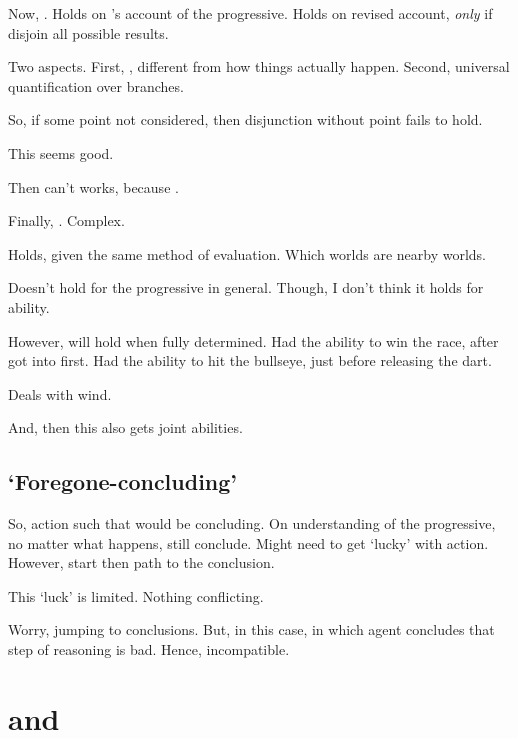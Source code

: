\begin{note}
  Now, \BoyVS{}.
  Holds on \citeauthor{Landman:1992wh}'s account of the progressive.
  Holds on revised account, \emph{only} if disjoin all possible results.

  Two aspects.
  First, \AlgGetPStops{}, different from how things actually happen.
  Second, universal quantification over branches.

  So, if some point not considered, then disjunction without point fails to hold.

  This seems good.

  Then can't works, because \AlgGetPStops{}.

  Finally, \BoyPS{}.
  Complex.

  Holds, given the same method of evaluation.
  Which worlds are nearby worlds.

  Doesn't hold for the progressive in general.
  Though, I don't think it holds for ability.

  However, will hold when fully determined.
  Had the ability to win the race, after got into first.
  Had the ability to hit the bullseye, just before releasing the dart.

  Deals with wind.

  And, then this also gets joint abilities.
\end{note}

\subsection{`Foregone-concluding'}
\label{sec:fc-progressive}

\begin{note}
  So, action such that would be concluding.
  On understanding of the progressive, no matter what happens, still conclude.
  Might need to get `lucky' with action.
  However, start then path to the conclusion.

  This `luck' is limited.
  Nothing conflicting.
\end{note}

\begin{note}
  Worry, jumping to conclusions.
  But, in this case, \pevent{} in which agent concludes that step of reasoning is bad.
  Hence, incompatible.
\end{note}

\section{ and }
\label{cha:fcs:sec:fcs-support}

